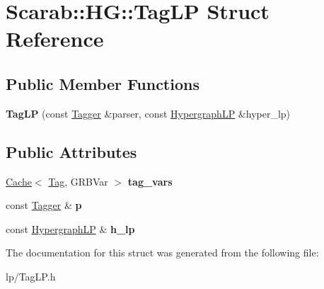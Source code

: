 \hypertarget{struct_scarab_1_1_h_g_1_1_tag_l_p}{
\section{Scarab::HG::TagLP Struct Reference}
\label{struct_scarab_1_1_h_g_1_1_tag_l_p}
}
\subsection*{Public Member Functions}
\begin{DoxyCompactItemize}
\item 
\hypertarget{struct_scarab_1_1_h_g_1_1_tag_l_p_a529942132dc8900bd25d2acaef721694}{
{\bfseries TagLP} (const \hyperlink{class_tagger}{Tagger} \&parser, const \hyperlink{struct_scarab_1_1_h_g_1_1_hypergraph_l_p}{HypergraphLP} \&hyper\_\-lp)}
\label{struct_scarab_1_1_h_g_1_1_tag_l_p_a529942132dc8900bd25d2acaef721694}

\end{DoxyCompactItemize}
\subsection*{Public Attributes}
\begin{DoxyCompactItemize}
\item 
\hypertarget{struct_scarab_1_1_h_g_1_1_tag_l_p_a4e80b783a5dfce94abb94cb957a3fe50}{
\hyperlink{class_cache}{Cache}$<$ \hyperlink{struct_tag}{Tag}, GRBVar $>$ {\bfseries tag\_\-vars}}
\label{struct_scarab_1_1_h_g_1_1_tag_l_p_a4e80b783a5dfce94abb94cb957a3fe50}

\item 
\hypertarget{struct_scarab_1_1_h_g_1_1_tag_l_p_a137ec6055ea83b552c873dd19f203c15}{
const \hyperlink{class_tagger}{Tagger} \& {\bfseries p}}
\label{struct_scarab_1_1_h_g_1_1_tag_l_p_a137ec6055ea83b552c873dd19f203c15}

\item 
\hypertarget{struct_scarab_1_1_h_g_1_1_tag_l_p_a92b885535389aa44e450e8f4682bf543}{
const \hyperlink{struct_scarab_1_1_h_g_1_1_hypergraph_l_p}{HypergraphLP} \& {\bfseries h\_\-lp}}
\label{struct_scarab_1_1_h_g_1_1_tag_l_p_a92b885535389aa44e450e8f4682bf543}

\end{DoxyCompactItemize}


The documentation for this struct was generated from the following file:\begin{DoxyCompactItemize}
\item 
lp/TagLP.h\end{DoxyCompactItemize}
